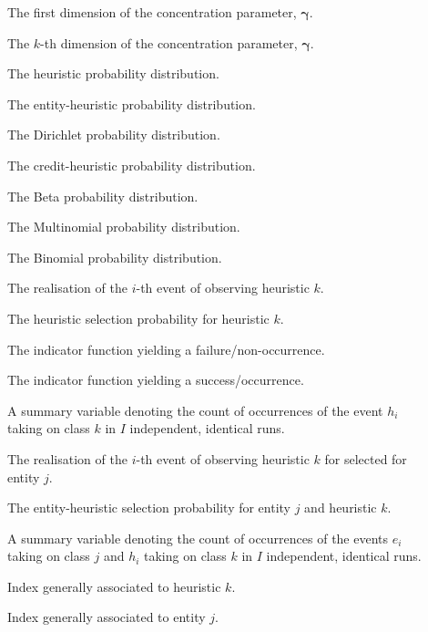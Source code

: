 \begin{description}
	\item [\parbox{2cm}{$\gamma_{1}$}] The first dimension of the concentration parameter, $\boldsymbol{\gamma}$.
	\item [\parbox{2cm}{$\gamma_{K}$}] The $k$-th dimension of the concentration parameter, $\boldsymbol{\gamma}$.
	\item [\parbox{2cm}{$\boldsymbol{\theta}$}] The heuristic probability distribution.
	\item [\parbox{2cm}{$\boldsymbol{\phi}$}] The entity-heuristic probability distribution.
	\item [\parbox{2cm}{$Dir$}] The Dirichlet probability distribution.
	\item [\parbox{2cm}{$\boldsymbol{\psi}$}] The credit-heuristic probability distribution.
	\item [\parbox{2cm}{$Beta$}] The Beta probability distribution.
	\item [\parbox{2cm}{$Mult$}] The Multinomial probability distribution.
	\item [\parbox{2cm}{$Bin$}] The Binomial probability distribution.
	\item [\parbox{2cm}{$h_{i,k}$}] The realisation of the $i$-th event of observing heuristic $k$.
	\item [\parbox{2cm}{$\theta_{k}$}] The heuristic selection probability for heuristic $k$.
	\item [\parbox{2cm}{$\mathbbm{1}_{0}$}] The indicator function yielding a failure/non-occurrence.
	\item [\parbox{2cm}{$\mathbbm{1}_{1}$}] The indicator function yielding a success/occurrence.
	\item [\parbox{2cm}{$N_{k}$}] A summary variable denoting the count of occurrences of the event $h_{i}$ taking on class $k$ in $I$ independent, identical runs.
	\item [\parbox{2cm}{$e_{i,j,k}$}] The realisation of the $i$-th event of observing heuristic $k$ for selected for entity $j$.
	\item [\parbox{2cm}{$\phi_{j,k}$}] The entity-heuristic selection probability for entity $j$ and heuristic $k$.
	\item [\parbox{2cm}{$N_{j,k}$}] A summary variable denoting the count of occurrences of the events $e_{i}$ taking on class $j$ and $h_{i}$ taking on class $k$ in $I$ independent, identical runs.
	\item [\parbox{2cm}{$k$}] Index generally associated to heuristic $k$.
	\item [\parbox{2cm}{$j$}] Index generally associated to entity $j$.

\end{description}
